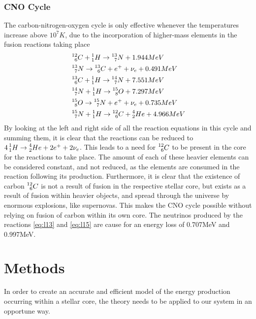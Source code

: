 \documentclass[10pt, nofootinbib, twocolumn]{revtex4-1}
\begin{document}
\subsubsection{CNO Cycle}
The carbon-nitrogen-oxygen cycle is only effective whenever the temperatures increase above $10^7K$, due to the incorporation of higher-mass elements in the fusion reactions taking place
\begin{align}
    & \prescript{12}{6}C+\prescript{1}{1}H\rightarrow\prescript{13}{7}N+1.944MeV \label{eq:lp12}\\
    & \prescript{13}{7}N \rightarrow \prescript{13}{6}C+e^++\nu_e+0.491MeV\label{eq:l13} \\
    & \prescript{13}{6}C + \prescript{1}{1}H\rightarrow \prescript{14}{7}N + 7.551MeV \label{eq:lp13}\\
    & \prescript{14}{7}N + \prescript{1}{1}H\rightarrow \prescript{15}{8}O+7.297MeV \label{eq:lp14}\\
    & \prescript{15}{8}O \rightarrow \prescript{15}{7}N +e^++\nu_e+0.735MeV\label{eq:l15} \\
    & \prescript{15}{7}N + \prescript{1}{1}H\rightarrow \prescript{12}{6}C + \prescript{4}{2}He+4.966MeV \label{eq:lp15}
\end{align}
By looking at the left and right side of all the reaction equations in this cycle and summing them, it is clear that the reactions can be reduced to $4\prescript{1}{1}H\rightarrow\prescript{4}{2}He+2e^++2\nu_e$. This leads to a need for $\prescript{12}{6}C$ to be present in the core for the reactions to take place. The amount of each of these heavier elements can be considered constant, and not reduced, as the elements are consumed in the reaction following its production. Furthermore, it is clear that the existence of carbon $\prescript{12}{6}C$ is not a result of fusion in the respective stellar core, but exists as a result of fusion within heavier objects, and spread through the universe by enormous explosions, like supernovas. This makes the CNO cycle possible without relying on fusion of carbon within its own core. The neutrinos produced by the reactions \eqref{eq:l13} and \eqref{eq:l15} are cause for an energy loss of 0.707MeV and 0.997MeV. \\




\section{Methods}\label{sec:methods} 
In order to create an accurate and efficient model of the energy production occurring within a stellar core, the theory needs to be applied to our system in an opportune way.   
\end{document}
